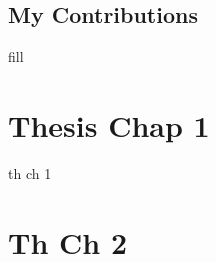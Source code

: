\documentclass[LaM,binding=0.6cm,english,noexaminfo]{sapthesis}
\begin{document}
\section{My Contributions} \label{contrib}
fill


\chapter{Thesis Chap 1}
th ch 1

\chapter{Th Ch 2}


\backmatter

\printbibliography

\cleardoublepage
\end{document}
